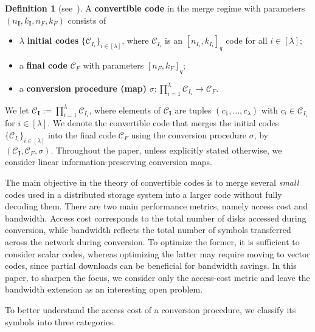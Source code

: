 \documentclass[conference, 10pt]{IEEEtran}
\theoremstyle{plain}
\theoremstyle{definition}
\newtheorem{definition}{Definition}
\newcommand{\mC}{\mathcal{C}}
\newcommand{\ben}[1]{{\color{red}(Ben: #1)}}
\begin{document}
\begin{definition}[\textnormal{see~\cite[Definition 3]{ge2024mds}}]
A \textbf{convertible code} in the merge regime with parameters $(n_\textbf{I},k_\textbf{I},n_F,k_F)$ consists of
    \begin{itemize}
        \item[(i)] $\lambda$ \textbf{initial codes} $\{\mC_{I_i}\}_{i \in [\lambda]}$, where $\mC_{I_i}$ is an $[n_{I_i}, k_{I_i}]_q$ code for all $i \in [\lambda]$;
        \item[(ii)] a \textbf{final code} $\mC_F$ with parameters $[n_F,k_F]_q$;
        \item[(iii)] a \textbf{conversion procedure (map)} $\sigma: \prod_{i=1}^{\lambda} \mC_{I_i} \longrightarrow \mC_F$.  
    \end{itemize}
We let $\mC_\textbf{I} :=\prod_{i=1}^{\lambda}\mC_{I_i}$, where elements of $\mC_{\textbf{I}}$ are tuples $(c_1,\dots,c_{\lambda})$ with $c_i \in \mC_{I_i}$ for $i \in [\lambda]$. We denote the convertible code that merges the initial codes $\{\mC_{I_i}\}_{i \in [\lambda]}$ into the final code $\mC_F$ using the conversion procedure $\sigma$, by $(\mC_\textbf{I},\mC_F,\sigma)$. Throughout the paper, unless explicitly stated otherwise, we consider linear information-preserving conversion maps. 
\end{definition}
The main objective in the theory of convertible codes is to merge several \emph{small} codes used in a distributed storage system into a larger code without fully decoding them. There are two main performance metrics, namely access cost and bandwidth. Access cost corresponds to the total number of disks accessed during conversion, while bandwidth reflects the total number of symbols transferred across the network during conversion. To optimize the former, it is sufficient to consider scalar codes, whereas optimizing the latter may require moving to vector codes, since partial downloads can be beneficial for bandwidth savings. In this paper, to sharpen the focus, we consider only the access-cost metric and leave the bandwidth extension as an interesting open problem. 

To better understand the access cost of a conversion procedure, we classify its symbols into three categories. 
\end{document}
